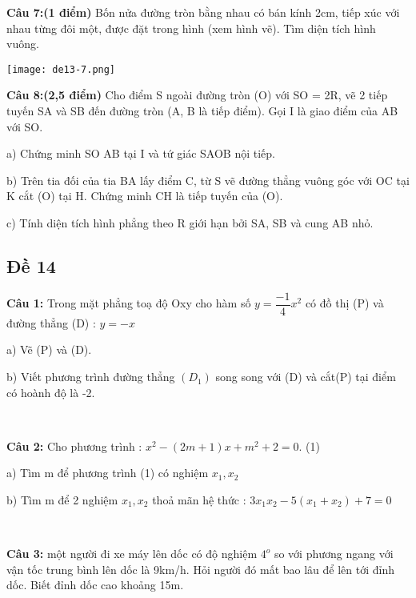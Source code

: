\documentclass[12pt]{article}
\begin{document}
\begin{multicols}{2}

\textbf{Câu 7:(1 điểm)} Bốn nửa đường tròn bằng nhau có bán kính 2cm, tiếp xúc với nhau từng đôi một, được đặt trong hình (xem hình vẽ). Tìm diện tích hình vuông.

\columnbreak

\begin{center}
    \texttt{[image: de13-7.png]}
\end{center}

\end{multicols}

\textbf{Câu 8:(2,5 điểm)} Cho điểm S ngoài đường tròn (O) với SO = 2R, vẽ 2 tiếp tuyến SA và SB đến đường tròn (A, B là tiếp điểm). Gọi I là giao điểm của AB với SO. \par
a) Chứng minh SO \pot AB tại I và tứ giác SAOB nội tiếp. \par
b) Trên tia đối của tia BA lấy điểm C, từ S vẽ đường thẳng vuông góc với OC tại K cắt (O) tại H. Chứng minh CH là tiếp tuyến của (O). \par
c) Tính diện tích hình phẳng theo R giới hạn bởi SA, SB và cung AB nhỏ.

\break

\subsection{Đề 14}

\textbf{Câu 1:} Trong mặt phẳng toạ độ Oxy cho hàm số $y = \dfrac{-1}{4}x^2$ có đồ thị  (P) và đường thẳng (D) : $y = -x$ \par
a) Vẽ  (P) và (D). \par
b) Viết phương trình đường thẳng $(D_1)$ song song với (D) và cắt(P) tại điểm có hoành độ là -2. \par

\ 

\textbf{Câu 2:} Cho phương trình : $x^2 - (2m + 1)x + m^2 +2 = 0.$ (1) \par
a) Tìm m để phương trình (1) có nghiệm $x_1, x_2$ \par
b) Tìm m để 2 nghiệm $x_1, x_2$ thoả mãn hệ thức : $3x_1x_2  - 5(x_1 + x_2) + 7 = 0$ \par

\   

\textbf{Câu 3:} một người đi xe máy lên dốc có độ nghiệm $4^o$ so với phương ngang với vận tốc trung bình lên dốc là 9km/h. Hỏi người đó mất bao lâu để lên tới đỉnh dốc. Biết đỉnh dốc cao khoảng 15m. \par
\end{document}
